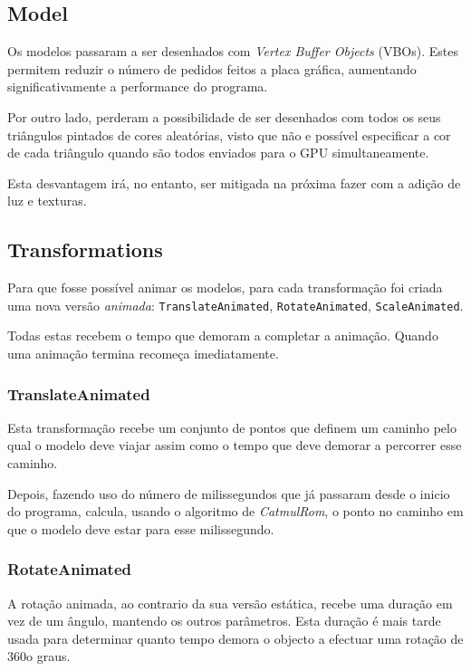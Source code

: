 \documentclass[a4paper]{article}
\begin{document}
\subsection{Model}

Os modelos passaram a ser desenhados com \textit{Vertex Buffer Objects} (VBOs). Estes permitem reduzir o número de pedidos feitos a placa gráfica, aumentando significativamente a performance do programa.

Por outro lado, perderam a possibilidade de ser desenhados com todos os seus triângulos pintados de cores aleatórias, visto que não e possível especificar a cor de cada triângulo quando são todos enviados para o GPU simultaneamente.

Esta desvantagem irá, no entanto, ser mitigada na próxima fazer com a adição de luz e texturas.

\subsection{Transformations}

Para que fosse possível animar os modelos, para cada transformação foi criada uma nova versão \textit{animada}: \texttt{TranslateAnimated}, \texttt{RotateAnimated}, \texttt{ScaleAnimated}.

Todas estas recebem o tempo que demoram a completar a animação. Quando uma animação termina recomeça imediatamente.

\subsubsection{TranslateAnimated}

Esta transformação recebe um conjunto de pontos que definem um caminho pelo qual o modelo deve viajar assim como o tempo que deve demorar a percorrer esse caminho.

Depois, fazendo uso do número de milissegundos que já passaram desde o inicio do programa, calcula, usando o algoritmo de \textit{CatmulRom}, o ponto no caminho em que o modelo deve estar para esse milissegundo.

\subsubsection{RotateAnimated}

A rotação animada, ao contrario da sua versão estática, recebe uma duração em vez de um ângulo, mantendo os outros parâmetros. Esta duração é mais tarde usada para determinar quanto tempo demora o objecto a efectuar uma rotação de 360o graus.
\end{document}
